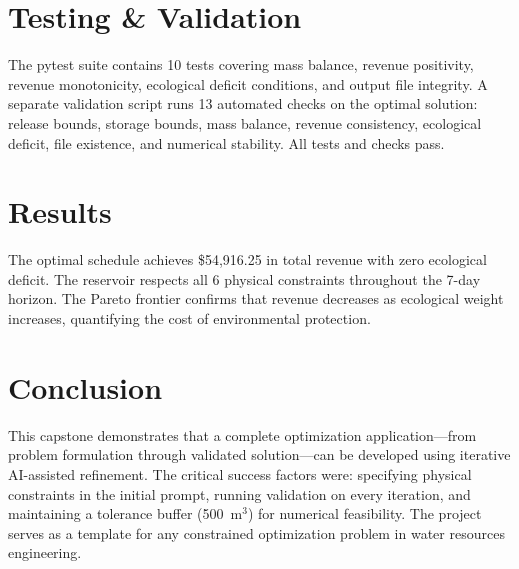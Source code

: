 \documentclass[12pt,a4paper]{article}
\begin{document}
\section{Testing \& Validation}
The pytest suite contains 10 tests covering mass balance, revenue positivity, revenue monotonicity, ecological deficit conditions, and output file integrity. A separate validation script runs 13 automated checks on the optimal solution: release bounds, storage bounds, mass balance, revenue consistency, ecological deficit, file existence, and numerical stability. All tests and checks pass.

\section{Results}
The optimal schedule achieves \$54,916.25 in total revenue with zero ecological deficit. The reservoir respects all 6 physical constraints throughout the 7-day horizon. The Pareto frontier confirms that revenue decreases as ecological weight increases, quantifying the cost of environmental protection.

\section{Conclusion}
This capstone demonstrates that a complete optimization application—from problem formulation through validated solution—can be developed using iterative AI-assisted refinement. The critical success factors were: specifying physical constraints in the initial prompt, running validation on every iteration, and maintaining a tolerance buffer (500~m$^3$) for numerical feasibility. The project serves as a template for any constrained optimization problem in water resources engineering.
\end{document}
